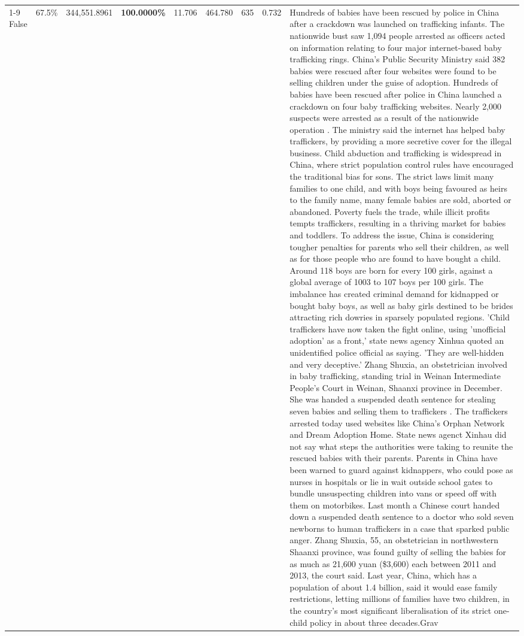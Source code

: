 \begin{table}[H]
\begin{tabular}{lllrlllll}
\cline{1-9}
False & 67.5\% & 344,551.8961 & \bfseries \color{red} 100.0000\% & 11.706 & 464.780 & 635 & 0.732 & Hundreds of babies have been rescued by police in China after a crackdown was launched on trafficking infants. The nationwide bust saw 1,094 people arrested as officers acted on information relating to four major internet-based baby trafficking rings. China's Public Security Ministry said 382 babies were rescued after four websites were found to be selling children under the guise of adoption. Hundreds of babies have been rescued after police in China launched a crackdown on four baby trafficking websites. Nearly 2,000 suspects were arrested as a result of the nationwide operation . The ministry said the internet has helped baby traffickers, by providing a more secretive cover for the illegal business. Child abduction and trafficking is widespread in China, where strict population control rules have encouraged the traditional bias for sons. The strict laws limit many families to one child, and with boys being favoured as heirs to the family name, many female babies are sold, aborted or abandoned. Poverty fuels the trade, while illicit profits tempts traffickers, resulting in a thriving market for babies and toddlers. To address the issue, China is considering tougher penalties for parents who sell their children, as well as for those people who are found to have bought a child. Around 118 boys are born for every 100 girls, against a global average of 1003 to 107 boys per 100 girls. The imbalance has created criminal demand for kidnapped or bought baby boys, as well as baby girls destined to be brides attracting rich dowries in sparsely populated regions. 'Child traffickers have now taken the fight online, using 'unofficial adoption' as a front,' state news agency Xinhua quoted an unidentified police official as saying. 'They are well-hidden and very deceptive.' Zhang Shuxia, an obstetrician involved in baby trafficking, standing trial in Weinan Intermediate People's Court in Weinan, Shaanxi province in December. She was handed a suspended death sentence for stealing seven babies and selling them to traffickers . The traffickers arrested today used websites like China's Orphan Network and Dream Adoption Home. State news agenct Xinhau did not say what steps the authorities were taking to reunite the rescued babies with their parents. Parents in China have been warned to guard against kidnappers, who could pose as nurses in hospitals or lie in wait outside school gates to bundle unsuspecting children into vans or speed off with them on motorbikes. Last month a Chinese court handed down a suspended death sentence to a doctor who sold seven newborns to human traffickers in a case that sparked public anger. Zhang Shuxia, 55, an obstetrician in northwestern Shaanxi province, was found guilty of selling the babies for as much as 21,600 yuan (\$3,600) each between 2011 and 2013, the court said. Last year, China, which has a population of about 1.4 billion, said it would ease family restrictions, letting millions of families have two children, in the country's most significant liberalisation of its strict one-child policy in about three decades.Grav \\

\end{tabular}
\end{table}
